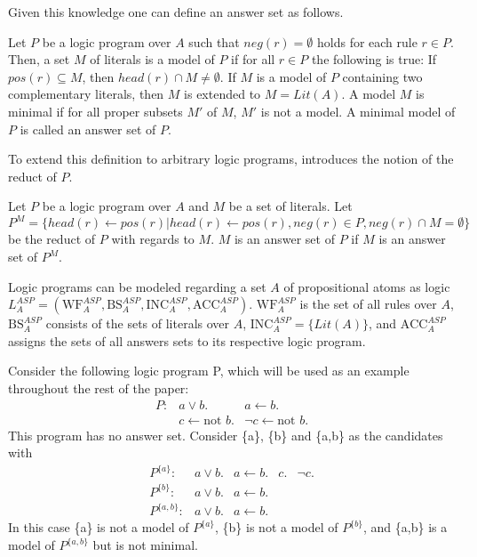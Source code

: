 Given this knowledge one can define an answer set as follows.

\begin{definition}
    Let \(P\) be a logic program over \(A\) such that \(neg(r) = \emptyset\) holds for each rule \(r \in P\). Then, a set \(M\) of literals is a model of \(P\) if for all \(r \in P\) the following is true: If \(pos(r) \subseteq M\), then \(head(r) \cap M \neq \emptyset\). If \(M\) is a model of \(P\) containing two complementary literals, then \(M\) is extended to \(M = Lit(A)\). A model \(M\) is minimal if for all proper subsets \(M'\) of \(M\), \(M'\) is not a model. A minimal model of \(P\) is called an answer set of \(P\).
\end{definition}

To extend this definition to arbitrary logic programs, \cite{ulbricht_handling_2020} introduces the notion of the reduct of \(P\).

\begin{definition}
    Let \(P\) be a logic program over \(A\) and \(M\) be a set of literals. Let \[P^M = \{head(r) \leftarrow pos(r) | head(r) \leftarrow pos(r), neg(r) \in P, neg(r) \cap M = \emptyset\}\] be the reduct of \(P\) with regards to \(M\). \(M\) is an answer set of \(P\) if \(M\) is an answer set of \(P^M\).
\end{definition}

Logic programs can be modeled regarding a set \(A\) of propositional atoms as logic \(L_A^{ASP} = (\text{WF}_A^{ASP}, \text{BS}_A^{ASP}, \text{INC}_A^{ASP}, \text{ACC}_A^{ASP})\). \(\text{WF}_A^{ASP}\) is the set of all rules over \(A\), \(\text{BS}_A^{ASP}\) consists of the sets of literals over \(A\), \(\text{INC}_A^{ASP} = \{Lit(A)\}\), and \(\text{ACC}_A^{ASP}\) assigns the sets of all answers sets to its respective logic program.

\begin{example}
    Consider the following logic program P, which will be used as an example throughout the rest of the paper:
    \[\begin{array}{rrr}
            P: & a \lor b.                  & a \leftarrow b.                 \\
               & c \leftarrow \text{not }b. & \neg c \leftarrow \text{not }b.
        \end{array}\]
    This program has no answer set. Consider \{a\}, \{b\} and \{a,b\} as the candidates with
    \[\begin{array}{rrrrr}
            P^{\{a\}}:   & a \lor b. & a \leftarrow b. & c. & \neg c. \\
            P^{\{b\}}:   & a \lor b. & a \leftarrow b.                \\
            P^{\{a,b\}}: & a \lor b. & a \leftarrow b.
        \end{array}\]
    In this case \{a\} is not a model of \(P^{\{a\}}\), \{b\} is not a model of \(P^{\{b\}}\), and \{a,b\} is a model of \(P^{\{a,b\}}\) but is not minimal.
    \label{ex:program}
\end{example}

